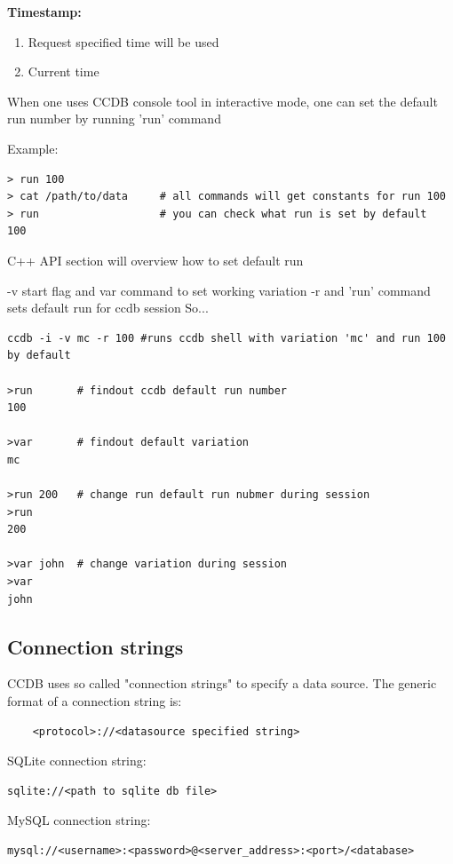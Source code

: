 \documentclass{article}
\begin{document}
\textbf{Timestamp:}
\begin{enumerate}
\item Request specified time will be used
\item Current time
\end{enumerate}

When one uses CCDB console tool in interactive mode, one can set the default run number by running 'run' command

Example:
\begin{verbatim}
> run 100
> cat /path/to/data     # all commands will get constants for run 100
> run                   # you can check what run is set by default
100
\end{verbatim}
C++ API section will overview how to set default run

-v start flag and var command to set working variation
-r and 'run' command sets default run for ccdb session
So...

\begin{verbatim}
ccdb -i -v mc -r 100 #runs ccdb shell with variation 'mc' and run 100 by default

>run       # findout ccdb default run number
100

>var       # findout default variation
mc

>run 200   # change run default run nubmer during session
>run
200

>var john  # change variation during session
>var 
john
\end{verbatim}

\subsection{Connection strings}\label{sec:connection}


CCDB uses so called "connection strings" to specify a data source.
The generic format of a connection string is:
\begin{verbatim}
    <protocol>://<datasource specified string>
\end{verbatim}

SQLite connection string:
\begin{verbatim}
sqlite://<path to sqlite db file>
\end{verbatim}

MySQL connection string:
\begin{verbatim}
mysql://<username>:<password>@<server_address>:<port>/<database>
\end{verbatim}
\end{document}
